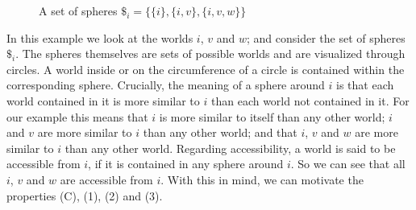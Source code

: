 \documentclass[a4paper,american,10pt]{paper}
\theoremstyle{definition}\newtheorem{definition}{Definition}
\begin{document}
\begin{figure}[H]
\centering
{}
\caption{A set of spheres $\$_i=\{\{ i\} ,\{ i,v\} ,\{ i,v,w\}\}$}
\label{fig:set_of_spheres}
\end{figure}

\noindent In this example we look at the worlds $i$, $v$ and $w$; and consider the set of spheres $\$_i$. The spheres themselves are sets of possible worlds and are visualized through circles. A world inside or on the circumference of a circle is contained within the corresponding sphere. Crucially, the meaning of a sphere around $i$ is that each world contained in it is more similar to $i$ than each world not contained in it. For our example this means that $i$ is more similar to itself than any other world; $i$ and $v$ are more similar to $i$ than any other world; and that $i$, $v$ and $w$ are more similar to $i$ than any other world. Regarding accessibility, a world is said to be accessible from $i$, if it is contained in any sphere around $i$. So we can see that all $i$, $v$ and $w$ are accessible from $i$. With this in mind, we can motivate the properties (C), (1), (2) and (3).\\
\end{document}
